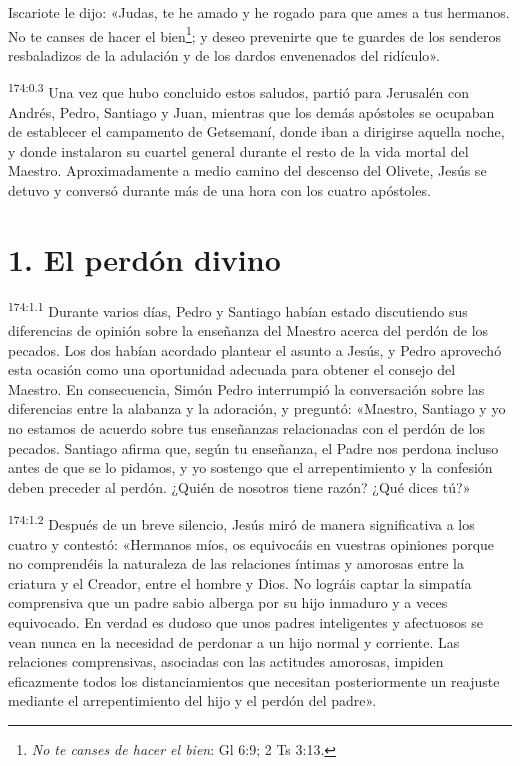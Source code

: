 Iscariote le dijo: «Judas, te he amado y he rogado para que ames a tus hermanos. No te canses de hacer el bien\footnote{\textit{No te canses de hacer el bien}: Gl 6:9; 2 Ts 3:13.}; y deseo prevenirte que te guardes de los senderos resbaladizos de la adulación y de los dardos envenenados del ridículo».

\par 
\textsuperscript{174:0.3} Una vez que hubo concluido estos saludos, partió para Jerusalén con Andrés, Pedro, Santiago y Juan, mientras que los demás apóstoles se ocupaban de establecer el campamento de Getsemaní, donde iban a dirigirse aquella noche, y donde instalaron su cuartel general durante el resto de la vida mortal del Maestro. Aproximadamente a medio camino del descenso del Olivete, Jesús se detuvo y conversó durante más de una hora con los cuatro apóstoles.

\section*{1. El perdón divino}
\par 
\textsuperscript{174:1.1} Durante varios días, Pedro y Santiago habían estado discutiendo sus diferencias de opinión sobre la enseñanza del Maestro acerca del perdón de los pecados. Los dos habían acordado plantear el asunto a Jesús, y Pedro aprovechó esta ocasión como una oportunidad adecuada para obtener el consejo del Maestro. En consecuencia, Simón Pedro interrumpió la conversación sobre las diferencias entre la alabanza y la adoración, y preguntó: «Maestro, Santiago y yo no estamos de acuerdo sobre tus enseñanzas relacionadas con el perdón de los pecados. Santiago afirma que, según tu enseñanza, el Padre nos perdona incluso antes de que se lo pidamos, y yo sostengo que el arrepentimiento y la confesión deben preceder al perdón. ¿Quién de nosotros tiene razón? ¿Qué dices tú?»

\par 
\textsuperscript{174:1.2} Después de un breve silencio, Jesús miró de manera significativa a los cuatro y contestó: «Hermanos míos, os equivocáis en vuestras opiniones porque no comprendéis la naturaleza de las relaciones íntimas y amorosas entre la criatura y el Creador, entre el hombre y Dios. No lográis captar la simpatía comprensiva que un padre sabio alberga por su hijo inmaduro y a veces equivocado. En verdad es dudoso que unos padres inteligentes y afectuosos se vean nunca en la necesidad de perdonar a un hijo normal y corriente. Las relaciones comprensivas, asociadas con las actitudes amorosas, impiden eficazmente todos los distanciamientos que necesitan posteriormente un reajuste mediante el arrepentimiento del hijo y el perdón del padre».

